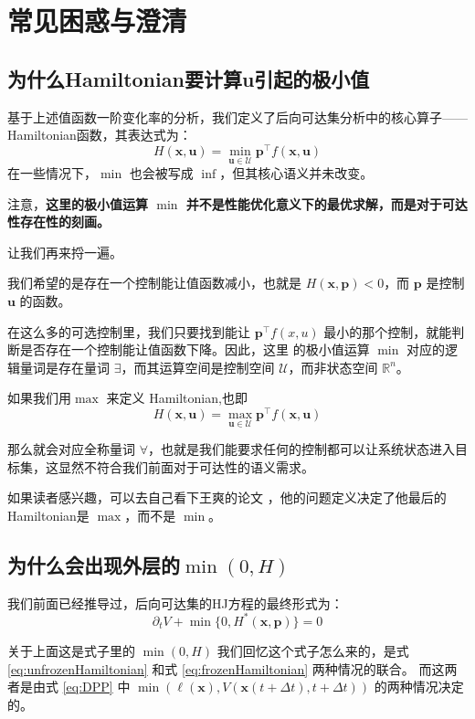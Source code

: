 \documentclass[11pt]{ctexrep}
\begin{document}
\section{常见困惑与澄清}

\subsection{为什么Hamiltonian要计算u引起的极小值}
基于上述值函数一阶变化率的分析，我们定义了后向可达集分析中的核心算子——Hamiltonian函数，其表达式为：
\[
H(\mathbf{x},\mathbf{u}) = \min_{\mathbf{u} \in \mathcal{U}} \mathbf{p}^\top f(\mathbf{x},\mathbf{u})
\]
在一些情况下，$\min$ 也会被写成 $\inf$，但其核心语义并未改变。

注意，\textbf{这里的极小值运算 $\min$ 并不是性能优化意义下的最优求解，而是对于可达性存在性的刻画。}

让我们再来捋一遍。

我们希望的是存在一个控制能让值函数减小，也就是 $H(\mathbf{x},\mathbf{p}) < 0$，而 $\mathbf{p}$ 是控制 $\mathbf{u}$
的函数。

在这么多的可选控制里，我们只要找到能让 $\mathbf{p}^\top f(x,u)$ 最小的那个控制，就能判断是否存在一个控制能让值函数下降。因此，这里
的极小值运算 $\min$ 对应的逻辑量词是存在量词 $\exists$，而其运算空间是控制空间 $\mathcal{U}$，而非状态空间 $\mathbb{R}^n$。

如果我们用$\max$ 来定义 Hamiltonian,也即
\[
H(\mathbf{x},\mathbf{u}) = \max_{\mathbf{u} \in \mathcal{U}} \mathbf{p}^\top f(\mathbf{x},\mathbf{u})
\]

那么就会对应全称量词 $\forall$，也就是我们能要求任何的控制都可以让系统状态进入目标集，这显然不符合我们前面对于可达性的语义需求。

如果读者感兴趣，可以去自己看下王爽的论文 \cite{ref2}，他的问题定义决定了他最后的Hamiltonian是 $\max$，而不是 $\min$。
\subsection{为什么会出现外层的$\min(0,H)$}

我们前面已经推导过，后向可达集的HJ方程的最终形式为：
\begin{equation*}
    \partial_t V + \min\{0, H^*(\mathbf{x},\mathbf{p})\} = 0
\end{equation*}

关于上面这是式子里的 $\min(0,H)$ 我们回忆这个式子怎么来的，是式 \ref{eq:unfrozenHamiltonian} 和式 \ref{eq:frozenHamiltonian} 两种情况的联合。
而这两者是由式 \ref{eq:DPP} 中 $\min(\ell(\mathbf{x}), V(\mathbf{x}(t+\Delta t),t+\Delta t))$ 的两种情况决定的。
\end{document}
